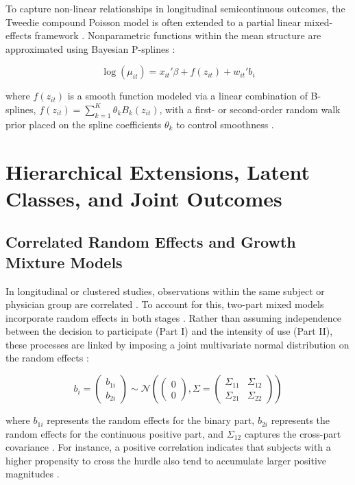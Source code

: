 \documentclass[11pt, a4paper]{article}
\begin{document}
To capture non-linear relationships in longitudinal semicontinuous outcomes, the Tweedie compound Poisson model is often extended to a partial linear mixed-effects framework \cite{ref26}. Nonparametric functions within the mean structure are approximated using Bayesian P-splines \cite{ref26}:

\begin{equation}
\log(\mu_{it}) = x_{it}' \beta + f(z_{it}) + w_{it}' b_i
\end{equation}

where $f(z_{it})$ is a smooth function modeled via a linear combination of B-splines, $f(z_{it}) = \sum_{k=1}^K \theta_k B_k(z_{it})$, with a first- or second-order random walk prior placed on the spline coefficients $\theta_k$ to control smoothness \cite{ref26, ref28}.

\section{Hierarchical Extensions, Latent Classes, and Joint Outcomes}

\subsection{Correlated Random Effects and Growth Mixture Models}
In longitudinal or clustered studies, observations within the same subject or physician group are correlated \cite{ref1, ref6}. To account for this, two-part mixed models incorporate random effects in both stages \cite{ref1, ref6}. Rather than assuming independence between the decision to participate (Part I) and the intensity of use (Part II), these processes are linked by imposing a joint multivariate normal distribution on the random effects \cite{ref1, ref6}:

\begin{equation}
b_i = \begin{pmatrix} b_{1i} \\ b_{2i} \end{pmatrix} \sim \mathcal{N}\left( \begin{pmatrix} 0 \\ 0 \end{pmatrix}, \Sigma = \begin{pmatrix} \Sigma_{11} & \Sigma_{12} \\ \Sigma_{21} & \Sigma_{22} \end{pmatrix} \right)
\end{equation}

where $b_{1i}$ represents the random effects for the binary part, $b_{2i}$ represents the random effects for the continuous positive part, and $\Sigma_{12}$ captures the cross-part covariance \cite{ref1, ref6, ref7}. For instance, a positive correlation indicates that subjects with a higher propensity to cross the hurdle also tend to accumulate larger positive magnitudes \cite{ref1, ref6, ref7}.
\end{document}
